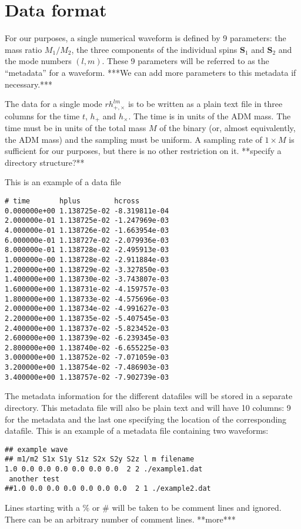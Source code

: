 \documentclass[amsmath,amssymb]{article}
\begin{document}
\section{Data format}
\label{sec:format}


For our purposes, a single numerical waveform is defined by 9
parameters: the mass ratio $M_1/M_2$, the three components of the
individual spins $\mathbf{S}_1$ and $\mathbf{S}_2$ and the mode
numbers $(l,m)$.  These 9 parameters will be referred to as the
``metadata'' for a waveform.  ***We can add more parameters to this
metadata if necessary.***

The data for a single mode $rh_{+,\times}^{lm}$ is to be written as a
plain text file in three columns for the time $t$, $h_+$ and
$h_\times$.  The time is in units of the ADM mass. The time must be in
units of the total mass $M$ of the binary (or, almost equivalently,
the ADM mass) and the sampling must be uniform.  A sampling rate of
$1\times M$ is sufficient for our purposes, but there is no other
restriction on it. **specify a directory structure?**

This is an example of a data file 
\begin{verbatim}
# time       hplus        hcross
0.000000e+00 1.138725e-02 -8.319811e-04
2.000000e-01 1.138725e-02 -1.247969e-03
4.000000e-01 1.138726e-02 -1.663954e-03
6.000000e-01 1.138727e-02 -2.079936e-03
8.000000e-01 1.138728e-02 -2.495913e-03
1.000000e-00 1.138728e-02 -2.911884e-03
1.200000e+00 1.138729e-02 -3.327850e-03
1.400000e+00 1.138730e-02 -3.743807e-03
1.600000e+00 1.138731e-02 -4.159757e-03
1.800000e+00 1.138733e-02 -4.575696e-03
2.000000e+00 1.138734e-02 -4.991627e-03
2.200000e+00 1.138735e-02 -5.407545e-03
2.400000e+00 1.138737e-02 -5.823452e-03
2.600000e+00 1.138739e-02 -6.239345e-03
2.800000e+00 1.138740e-02 -6.655225e-03
3.000000e+00 1.138752e-02 -7.071059e-03
3.200000e+00 1.138754e-02 -7.486903e-03
3.400000e+00 1.138757e-02 -7.902739e-03
\end{verbatim}

The metadata information for the different datafiles will be stored in
a separate directory.  This metadata file will also be plain text and
will have 10 columns: 9 for the metadata and the last one specifying
the location of the corresponding datafile.  This is an example of a
metadata file containing two waveforms:
\begin{verbatim}
## example wave
## m1/m2 S1x S1y S1z S2x S2y S2z l m filename
1.0 0.0 0.0 0.0 0.0 0.0 0.0  2 2 ./example1.dat
 another test
##1.0 0.0 0.0 0.0 0.0 0.0 0.0  2 1 ./example2.dat
\end{verbatim}
Lines starting with a $\%$ or $\#$ will be taken to be comment lines and
ignored. There can be an arbitrary number of comment lines.  **more***
\end{document}
